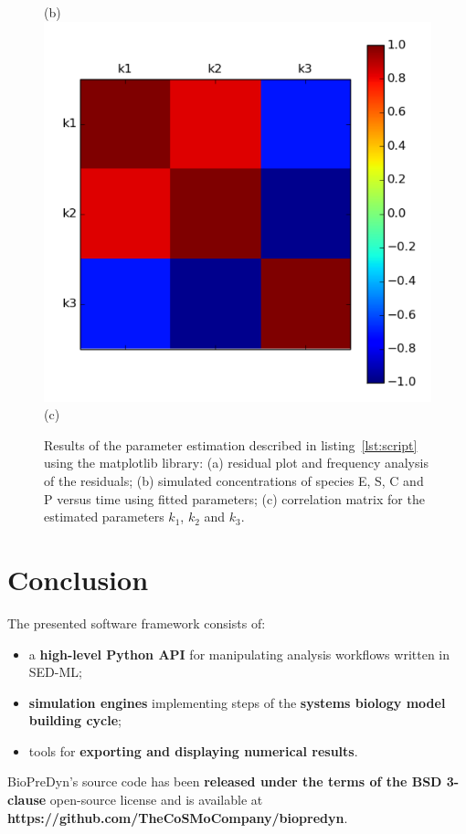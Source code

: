 \documentclass[17pt,portrait,a1,usenames,dvipsnames,plainboxedsections]{sciposter}
\begin{document}
\begin{multicols}{2}
\begin{figure}
\begin{center}
\begin{minipage}[c]{0.41\textwidth}
(b)\\
\includegraphics[width=\textwidth]{correlation_matrix.pdf}\\
(c)\\
\end{minipage}
\caption{Results of the parameter estimation described in
listing~\ref{lst:script} using the matplotlib library: (a) residual plot and
frequency analysis of the residuals; (b) simulated concentrations of species E,
S, C and P versus time using fitted parameters; (c) correlation matrix for the
estimated parameters $k_{1}$, $k_{2}$ and $k_{3}$.}
\label{fig:results}
\end{center}
\end{figure}

\section{Conclusion}
The presented software framework consists of:
\begin{itemize}
\item
a {\bf high-level Python API} for manipulating analysis workflows written in
SED-ML;
\item
{\bf simulation engines} implementing steps of the {\bf systems biology model
building cycle};
\item
tools for {\bf exporting and displaying numerical results}.
\end{itemize}
BioPreDyn's source code has been {\bf released under the terms of the BSD
3-clause} open-source license and is available at
{\bf https://github.com/TheCoSMoCompany/biopredyn}.
{}

\end{multicols}
\end{document}
